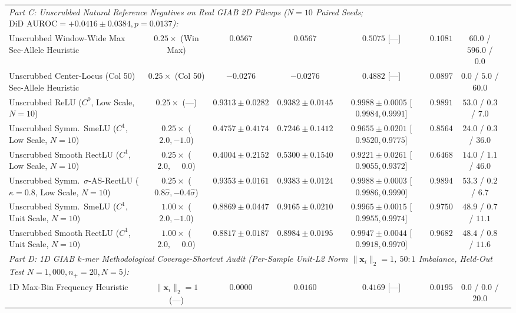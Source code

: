 \documentclass[11pt, a4paper]{article}
\begin{document}
\begin{table}[!htbp]
{\begin{tabular}{l c c c c c c c}
\midrule
\multicolumn{7}{l}{\textit{Part C: Unscrubbed Natural Reference Negatives on Real GIAB 2D Pileups ($N=10$ Paired Seeds; $\text{DiD AUROC} = +0.0416 \pm 0.0384, p = 0.0137$):}} \\
Unscrubbed Window-Wide Max Sec-Allele Heuristic & $0.25\times$ (Win Max) & $0.0567$ & $0.0567$ & $0.5075$ [---] & $0.1081$ & $60.0$ / $596.0$ / $0.0$ \\
Unscrubbed Center-Locus (Col 50) Sec-Allele Heuristic & $0.25\times$ (Col 50) & $-0.0276$ & $-0.0276$ & $0.4882$ [---] & $0.0897$ & $0.0$ / $5.0$ / $60.0$ \\
Unscrubbed ReLU ($C^{0}$, Low Scale, $N=10$) & $0.25\times$ (---) & $0.9313 \pm 0.0282$ & $0.9382 \pm 0.0145$ & \textbf{$0.9988 \pm 0.0005$} [$0.9984, 0.9991$] & $0.9891$ & $53.0$ / $0.3$ / $7.0$ \\
Unscrubbed Symm.\ SmeLU ($C^{1}$, Low Scale, $N=10$) & $0.25\times$ ($2.0, -1.0$) & $0.4757 \pm 0.4174$ & $0.7246 \pm 0.1412$ & $0.9655 \pm 0.0201$ [$0.9520, 0.9775$] & $0.8564$ & $24.0$ / $0.3$ / $36.0$ \\
\rowcolor{alertred}
Unscrubbed Smooth RectLU ($C^{1}$, Low Scale, $N=10$) & $0.25\times$ ($2.0, \phantom{-}0.0$) & $0.4004 \pm 0.2152$ & $0.5300 \pm 0.1540$ & $0.9221 \pm 0.0261$ [$0.9055, 0.9372$] & $0.6468$ & $14.0$ / $1.1$ / $46.0$ \\
\rowcolor{goodgreen}
Unscrubbed Symm.\ $\sigma$-AS-RectLU ($\kappa=0.8$, Low Scale, $N=10$) & $0.25\times$ ($0.8\hat{\sigma}, -0.4\hat{\sigma}$) & \textbf{$0.9353 \pm 0.0161$} & \textbf{$0.9383 \pm 0.0124$} & \textbf{$0.9988 \pm 0.0003$} [$0.9986, 0.9990$] & \textbf{$0.9894$} & $53.3$ / $0.2$ / $6.7$ \\
Unscrubbed Symm.\ SmeLU ($C^{1}$, Unit Scale, $N=10$) & $1.00\times$ ($2.0, -1.0$) & \textbf{$0.8869 \pm 0.0447$} & \textbf{$0.9165 \pm 0.0210$} & \textbf{$0.9965 \pm 0.0015$} [$0.9955, 0.9974$] & \textbf{$0.9750$} & $48.9$ / $0.7$ / $11.1$ \\
\rowcolor{goodgreen}
Unscrubbed Smooth RectLU ($C^{1}$, Unit Scale, $N=10$) & $1.00\times$ ($2.0, \phantom{-}0.0$) & $0.8817 \pm 0.0187$ & $0.8984 \pm 0.0195$ & $0.9947 \pm 0.0044$ [$0.9918, 0.9970$] & $0.9682$ & $48.4$ / $0.8$ / $11.6$ \\
\midrule
\multicolumn{7}{l}{\textit{Part D: 1D GIAB $k$-mer Methodological Coverage-Shortcut Audit (Per-Sample Unit-L2 Norm $\|\mathbf{x}_{i}\|_{2}=1$, $50:1$ Imbalance, Held-Out Test $N=1,000, n_{+}=20, N=5$):}} \\
1D Max-Bin Frequency Heuristic & $\|\mathbf{x}_{i}\|_{2}=1$ (---) & $0.0000$ & $0.0160$ & $0.4169$ [---] & $0.0195$ & $0.0$ / $0.0$ / $20.0$ \\

\end{tabular}}
\end{table}
\end{document}
